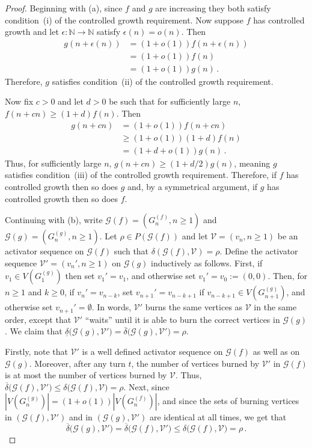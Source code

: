 \documentclass[12pt]{article}
\theoremstyle{remark}
\providecommand{\N}{}
\renewcommand{\N}{{\mathbb N}}
\newcommand\cG{\mathcal G}
\newcommand\cV{\mathcal V}
\begin{document}
\begin{proof}
Beginning with (a), since $f$ and $g$ are increasing they both satisfy condition~(i) of the controlled growth requirement. Now suppose $f$ has controlled growth and let $\epsilon: \N \to \N$ satisfy $\epsilon
(n) = o(n)$. Then
\begin{align*}
g(n+\epsilon(n)) 
&= 
(1+o(1)) f(n+\epsilon(n))\\
&=
(1+o(1)) f(n)\\
&=
(1+o(1)) g(n) \,.
\end{align*}
Therefore, $g$ satisfies condition~(ii) of the controlled growth requirement. 

Now fix $c > 0$ and let $d > 0$ be such that for sufficiently large $n$, $f(n+cn) \geq (1+d)f(n)$. Then
\begin{align*}
g(n+cn) 
&= 
(1+o(1)) f(n+cn)\\
&\geq 
(1+o(1)) (1+d)f(n)\\
&=
(1+d+o(1))g(n) \,.
\end{align*}
Thus, for sufficiently large $n$, $g(n+cn) \geq (1+d/2) g(n)$, meaning $g$ satisfies condition~(iii) of the controlled growth requirement. Therefore, if $f$ has controlled growth then so does $g$ and, by a symmetrical argument, if $g$ has controlled growth then so does $f$. 

Continuing with (b), write $\cG(f) = (G^{(f)}_n,n \geq 1)$ and $\cG(g) = (G^{(g)}_n,n \geq 1)$. Let $\rho \in P(\cG(f))$ and let $\cV = (v_n,n\geq 1)$ be an activator sequence on $\cG(f)$ such that $\delta(\cG(f),\cV) = \rho$. Define the activator sequence $\cV' = (v_n', n \geq 1)$ on $\cG(g)$ inductively as follows. First, if $v_1 \in V(G^{(g)}_1)$ then set $v_1'=v_1$, and otherwise set $v_1' = v_0 := (0,0)$. Then, for $n \geq 1$ and $k \geq 0$, if $v_n' = v_{n-k}$, set $v_{n+1}' = v_{n-k+1}$ if $v_{n-k+1} \in V(G^{(g)}_{n+1})$, and otherwise set $v_{n+1}' = \emptyset$. In words, $\cV'$ burns the same vertices as $\cV$ in the same order, except that $\cV'$ ``waits'' until it is able to burn the correct vertices in $\cG(g)$. We claim that $\underline{\delta}\big( \cG(g), \cV' \big) = \overline{\delta}\big( \cG(g), \cV' \big) = \rho$. 

Firstly, note that $\cV'$ is a well defined activator sequence on $\cG(f)$ as well as on $\cG(g)$. Moreover, after any turn $t$, the number of vertices burned by $\cV'$ in $\cG(f)$ is at most the number of vertices burned by $\cV$. Thus, $\overline{\delta}\big( \cG(f), \cV' \big) \leq \delta\big( \cG(f), \cV \big) = \rho$. Next, since $|V(G^{(g)}_n)| = (1+o(1))|V(G^{(f)}_n)|$, and since the sets of burning vertices in $(\cG(f),\cV')$ and in $(\cG(g),\cV')$ are identical at all times, we get that 
\[
\overline{\delta}\big( \cG(g), \cV' \big) = \overline{\delta}\big( \cG(f), \cV' \big) \leq \delta\big( \cG(f), \cV \big) = \rho \,.
\]


\end{proof}
\end{document}
